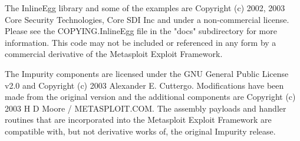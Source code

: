\documentclass{report}
\begin{document}
\par
The InlineEgg library and some of the examples are Copyright (c) 2002, 2003 Core
Security Technologies, Core SDI Inc and under a non-commercial license. Please
see the COPYING.InlineEgg file in the "docs" subdirectory for more information.
This code may not be included or referenced in any form by a commercial
derivative of the Metasploit Exploit Framework.

\par
The Impurity components are licensed under the GNU General Public License v2.0
and Copyright (c) 2003 Alexander E. Cuttergo. Modifications have been made from
the original version and the additional components are Copyright (c) 2003 H D
Moore / METASPLOIT.COM. The assembly payloads and handler routines that are
incorporated into the Metasploit Exploit Framework are compatible with, but not
derivative works of, the original Impurity release.
\end{document}
